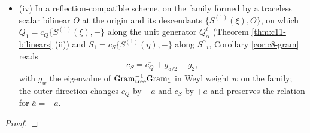 \begin{proposition}
\begin{itemize}
\item (iv) In a reflection-compatible scheme, on the family formed by a traceless scalar bilinear $O$ at the origin and its descendants $\{S^{(1)}(\xi),O\}$, on which $Q_1=c_Q\{S^{(1)}(\xi),-\}$ along the unit generator $Q^i_\alpha$ (Theorem \ref{thm:c11-bilinears} (ii)) and $S_1=c_S\{S^{(1)}(\eta),-\}$ along $S^\alpha{}_i$, Corollary \ref{cor:c8-gram} reads
\[
c_S=\overline{c_Q}+g_{5/2}-g_2,
\]
with $g_w$ the eigenvalue of $\mathrm{Gram}_{\rm tree}^{-1}\mathrm{Gram}_{\rm 1}$ in Weyl weight $w$ on the family; the outer direction changes $c_Q$ by $-a$ and $c_S$ by $+a$ and preserves the relation for $\bar a=-a$.
\end{itemize}
\end{proposition}

\begin{proof}

\end{proof}
